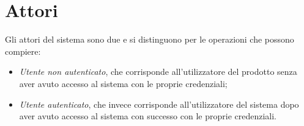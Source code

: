 \section{Attori}
\label{sec:attori}

Gli attori del sistema sono due e si distinguono per le operazioni che possono compiere:
\begin{itemize}
    \item \emph{Utente non autenticato}, che corrisponde all'utilizzatore del prodotto senza aver avuto accesso al sistema con le proprie credenziali;
    \item \emph{Utente autenticato}, che invece corrisponde all'utilizzatore del sistema dopo aver avuto accesso al sistema con successo con le proprie credenziali.
\end{itemize}